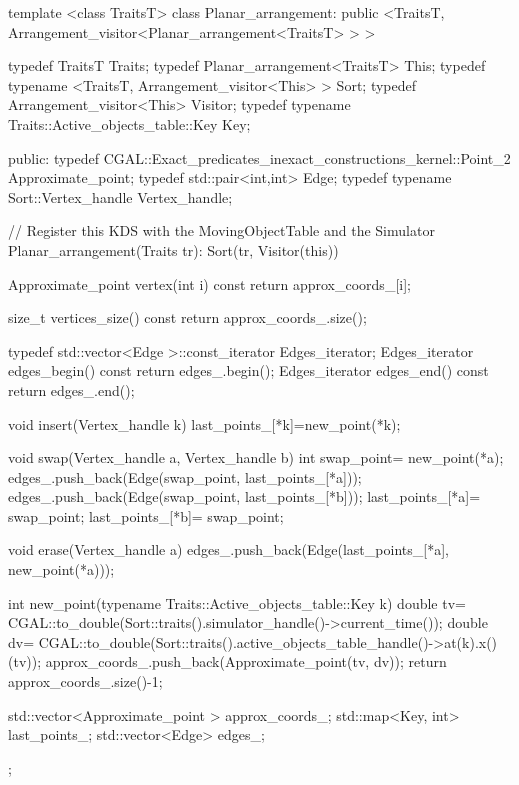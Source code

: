 \begin{ccExampleCode}

template <class TraitsT> 
class Planar_arrangement: 
  public <TraitsT, 
			     Arrangement_visitor<Planar_arrangement<TraitsT> > > {
  typedef TraitsT Traits;
  typedef Planar_arrangement<TraitsT> This;
  typedef typename <TraitsT,
				       Arrangement_visitor<This> > Sort;
  typedef Arrangement_visitor<This> Visitor;
  typedef typename Traits::Active_objects_table::Key Key;

public:
  typedef CGAL::Exact_predicates_inexact_constructions_kernel::Point_2 Approximate_point;
  typedef std::pair<int,int> Edge;
  typedef typename Sort::Vertex_handle Vertex_handle; 

  // Register this KDS with the MovingObjectTable and the Simulator
  Planar_arrangement(Traits tr): Sort(tr, Visitor(this)) {}

  Approximate_point vertex(int i) const
  {
    return approx_coords_[i];
  }

  size_t vertices_size() const
  {
    return approx_coords_.size();
  }

  typedef std::vector<Edge >::const_iterator Edges_iterator;
  Edges_iterator edges_begin() const
  {
    return edges_.begin();
  }
  Edges_iterator edges_end() const
  {
    return edges_.end();
  }

  void insert(Vertex_handle k) {
    last_points_[*k]=new_point(*k);
  }

  void swap(Vertex_handle a, Vertex_handle b) {
    int swap_point= new_point(*a);
    edges_.push_back(Edge(swap_point, last_points_[*a]));
    edges_.push_back(Edge(swap_point, last_points_[*b]));
    last_points_[*a]= swap_point;
    last_points_[*b]= swap_point;
  }

  void erase(Vertex_handle a) {
    edges_.push_back(Edge(last_points_[*a], new_point(*a)));
  }

  int new_point(typename Traits::Active_objects_table::Key k) {
    double tv= CGAL::to_double(Sort::traits().simulator_handle()->current_time());
    double dv= CGAL::to_double(Sort::traits().active_objects_table_handle()->at(k).x()(tv));
    approx_coords_.push_back(Approximate_point(tv, dv));
    return approx_coords_.size()-1;
  }

  std::vector<Approximate_point > approx_coords_;
  std::map<Key, int> last_points_;
  std::vector<Edge> edges_;

};
\end{ccExampleCode}

